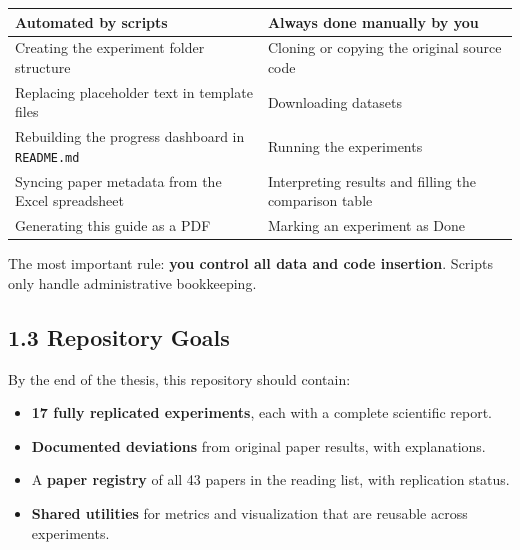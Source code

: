 {\def\LTcaptype{none} %
\small
\begin{longtable}[]{@{}
  >{\raggedright\arraybackslash}p{}
  >{\raggedright\arraybackslash}p{}@{}}
\toprule\noalign{}
\begin{minipage}[b]{\linewidth}\raggedright
Automated by scripts
\end{minipage} & \begin{minipage}[b]{\linewidth}\raggedright
Always done manually by you
\end{minipage} \\
\midrule\noalign{}
\endhead
\bottomrule\noalign{}
\endlastfoot
Creating the experiment folder structure & Cloning or copying the
original source code \\
Replacing placeholder text in template files & Downloading datasets \\
Rebuilding the progress dashboard in \texttt{README.md}
& Running the experiments \\
Syncing paper metadata from the Excel spreadsheet & Interpreting results
and filling the comparison table \\
Generating this guide as a PDF & Marking an experiment as Done \\
\end{longtable}
}

The most important rule: \textbf{you control all data and code
insertion}. Scripts only handle administrative bookkeeping.

\subsection{1.3 Repository Goals}\label{repository-goals}

By the end of the thesis, this repository should contain:

\begin{itemize}
\tightlist
\item
  \textbf{17 fully replicated experiments}, each with a complete
  scientific report.
\item
  \textbf{Documented deviations} from original paper results, with
  explanations.
\item
  A \textbf{paper registry} of all 43 papers in the reading list, with
  replication status.
\item
  \textbf{Shared utilities} for metrics and visualization that are
  reusable across experiments.
\end{itemize}

